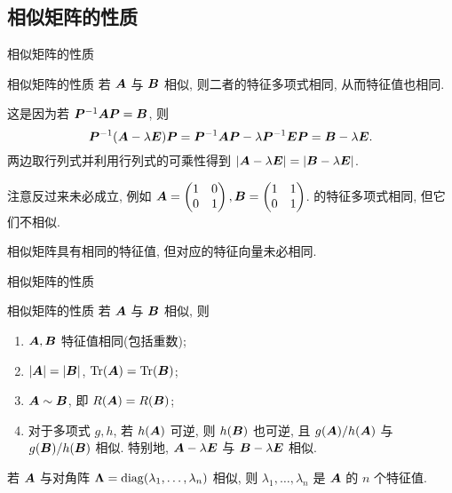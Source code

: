 \subsection{相似矩阵的性质}

\begin{frame}{相似矩阵的性质}
	\onslide<+->
	\begin{second}{相似矩阵的性质}
		若 $\bfA$ 与 $\bfB$ 相似, 则二者的特征多项式相同, 从而特征值也相同.
	\end{second}
	\onslide<+->
	这是因为若 $\bfP^{-1}\bfA\bfP=\bfB$, 则
	\[\bfP^{-1}(\bfA-\lambda\bfE)\bfP=\bfP^{-1}\bfA\bfP-\lambda\bfP^{-1}\bfE\bfP=\bfB-\lambda\bfE.\]
	\onslide<+->
	两边取行列式并利用行列式的可乘性得到 $|\bfA-\lambda\bfE|=|\bfB-\lambda\bfE|$.

	\onslide<+->
	注意反过来未必成立, 例如 $\bfA=\begin{pmatrix}
		1&0\\
		0&1
	\end{pmatrix}, \bfB=\begin{pmatrix}
		1&1\\
		0&1
	\end{pmatrix}$.
	的特征多项式相同, 但它们不相似.

	\onslide<+->
	相似矩阵具有相同的特征值, 但对应的特征向量未必相同.
\end{frame}


\begin{frame}{相似矩阵的性质}
	\onslide<+->
	\begin{second}{相似矩阵的性质}
		若 $\bfA$ 与 $\bfB$ 相似, 则
		\begin{enumerate}
			\item \alert{$\bfA,\bfB$ 特征值相同(包括重数)};
			\item \alert{$|\bfA|=|\bfB|$, $\Tr(\bfA)=\Tr(\bfB)$};
			\item $\bfA\sim\bfB$, 即 \alert{$R(\bfA)=R(\bfB)$};
			\item 对于多项式 $g,h$, 若 $h(\bfA)$ 可逆, 则 $h(\bfB)$ 也可逆, 且 $g(\bfA)/h(\bfA)$ 与 $g(\bfB)/h(\bfB)$ 相似.
			特别地, $\bfA-\lambda\bfE$ 与 $\bfB-\lambda\bfE$ 相似.
		\end{enumerate}
	\end{second}
	\onslide<+->
	\begin{corollary}
		若 $\bfA$ 与对角阵 $\bmL=\diag(\lambda_1,\dots,\lambda_n)$ 相似, 则 $\lambda_1,\dots,\lambda_n$ 是 $\bfA$ 的 $n$ 个特征值.
	\end{corollary}
\end{frame}


